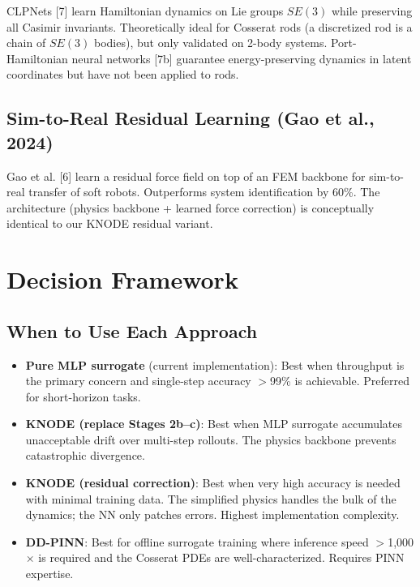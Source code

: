 \documentclass[11pt]{article}
\begin{document}
CLPNets [7] learn Hamiltonian dynamics on Lie groups $SE(3)$ while preserving all Casimir invariants.
Theoretically ideal for Cosserat rods (a discretized rod is a chain of $SE(3)$ bodies), but only validated on 2-body systems.
Port-Hamiltonian neural networks [7b] guarantee energy-preserving dynamics in latent coordinates but have not been applied to rods.

\subsection{Sim-to-Real Residual Learning (Gao et al., 2024)}

Gao et al. [6] learn a residual force field on top of an FEM backbone for sim-to-real transfer of soft robots.
Outperforms system identification by 60\%.
The architecture (physics backbone + learned force correction) is conceptually identical to our KNODE residual variant.


\section{Decision Framework}
\label{sec:decision}

\subsection{When to Use Each Approach}

\begin{itemize}
  \item \textbf{Pure MLP surrogate} (current implementation): Best when throughput is the primary concern and single-step accuracy $>$99\% is achievable.  Preferred for short-horizon tasks.
  \item \textbf{KNODE (replace Stages 2b--c)}: Best when MLP surrogate accumulates unacceptable drift over multi-step rollouts.  The physics backbone prevents catastrophic divergence.
  \item \textbf{KNODE (residual correction)}: Best when very high accuracy is needed with minimal training data.  The simplified physics handles the bulk of the dynamics; the NN only patches errors.  Highest implementation complexity.
  \item \textbf{DD-PINN}: Best for offline surrogate training where inference speed $>$1{,}000$\times$ is required and the Cosserat PDEs are well-characterized.  Requires PINN expertise.
\end{itemize}
\end{document}
